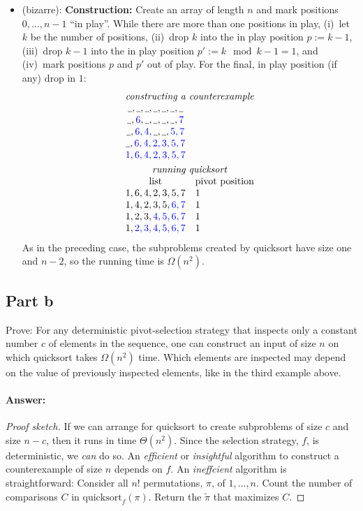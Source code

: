 \documentclass[a4paper]{article}
\begin{document}
\begin{itemize}
	\item (bizarre):
	\textbf{Construction:}
	Create an array of length $n$ and mark positions $0, \ldots, n-1$ ``in play''.
	While there are more than one positions in play,
	(i)~let $k$ be the number of positions,
	(ii)~drop $k$ into the in play position $p := k-1$,
	(iii)~drop $k-1$ into the in play position $p' := k \mod k-1 = 1$, and
	(iv)~mark positions $p$ and $p'$ out of play.
	For the final, in play position (if any) drop in $1$:
	\[
		\begin{array}{cl}
		\multicolumn{2}{c}{\text{\emph{constructing a counterexample}}} \\
		\HOLE, \HOLE, \HOLE, \HOLE, \HOLE, \HOLE, \HOLE \\
		\HOLE, \USED{6}, \HOLE, \HOLE, \HOLE, \HOLE, \USED{7} \\
		\HOLE, \USED{6, 4}, \HOLE, \HOLE, \USED{5, 7} \\
		\HOLE, \USED{6, 4, 2, 3, 5, 7} \\
		\USED{1, 6, 4, 2, 3, 5, 7} \\[\jot]
		\multicolumn{2}{c}{\text{\emph{running quicksort}}} \\
		\text{list} & \text{pivot position} \\
		1, 6, 4, 2, 3, 5, 7 & 1\\
		1, 4, 2, 3, 5, \USED{6, 7} & 1\\
		1, 2, 3, \USED{4, 5, 6, 7} & 1\\
		1, \USED{2, 3, 4, 5, 6, 7} & 1\\
		\end{array}
	\]
	As in the preceding case, the subproblems created by quicksort have size one and $n-2$, so the running time is $\Omega(n^2)$.
\end{itemize}

\subsection{Part b}

Prove: For any deterministic pivot-selection strategy that inspects only a constant number $c$ of elements in the sequence, one can construct an input of size $n$ on which quicksort takes $\Omega(n^2)$ time.
Which elements are inspected may depend on the value of previously inspected elements, like in the third example above.

\paragraph{Answer:}
\begin{proof}[Proof sketch]
If we can arrange for quicksort to create subproblems of size $c$ and size $n-c$, then it runs in time $\Theta(n^2)$.
Since the selection strategy, $f$, is deterministic, we \emph{can} do so.
An \emph{efficient} or \emph{insightful} algorithm to construct a counterexample of size $n$ depends on $f$.
An \emph{ineffcient} algorithm is straightforward:
Consider all $n!$ permutations, $\pi$, of $1, \ldots, n$.
Count the number of comparisons $C$ in $\text{quicksort}_f(\pi)$.
Return the $\tilde \pi$ that maximizes $C$.
\end{proof}
\end{document}
